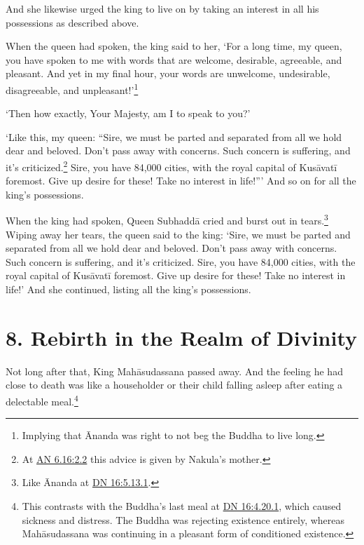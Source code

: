 \documentclass[12pt,openany]{book}%
\begin{document}
And she likewise urged the king to live on by taking an interest in all his possessions as described above. 

When the queen had spoken, the king said to her, ‘For a long time, my queen, you have spoken to me with words that are welcome, desirable, agreeable, and pleasant. And yet in my final hour, your words are unwelcome, undesirable, disagreeable, and unpleasant!’\footnote{Implying that Ānanda was right to not beg the Buddha to live long. } 

‘Then how exactly, Your Majesty, am I to speak to you?’ 

‘Like this, my queen: “Sire, we must be parted and separated from all we hold dear and beloved. Don’t pass away with concerns. Such concern is suffering, and it’s criticized.\footnote{At \href{https://suttacentral.net/an6.16/en/sujato\#2.2}{AN 6.16:2.2} this advice is given by Nakula’s mother. } Sire, you have 84,000 cities, with the royal capital of \textsanskrit{Kusāvatī} foremost. Give up desire for these! Take no interest in life!”’ And so on for all the king’s possessions. 

When the king had spoken, Queen \textsanskrit{Subhaddā} cried and burst out in tears.\footnote{Like Ānanda at \href{https://suttacentral.net/dn16/en/sujato\#5.13.1}{DN 16:5.13.1}. } Wiping away her tears, the queen said to the king: ‘Sire, we must be parted and separated from all we hold dear and beloved. Don’t pass away with concerns. Such concern is suffering, and it’s criticized. Sire, you have 84,000 cities, with the royal capital of \textsanskrit{Kusāvatī} foremost. Give up desire for these! Take no interest in life!’ And she continued, listing all the king’s possessions. 

\section*{8. Rebirth in the Realm of Divinity}

Not long after that, King \textsanskrit{Mahāsudassana} passed away. And the feeling he had close to death was like a householder or their child falling asleep after eating a delectable meal.\footnote{This contrasts with the Buddha’s last meal at \href{https://suttacentral.net/dn16/en/sujato\#4.20.1}{DN 16:4.20.1}, which caused sickness and distress. The Buddha was rejecting existence entirely, whereas \textsanskrit{Mahāsudassana} was continuing in a pleasant form of conditioned existence. } 
\end{document}

